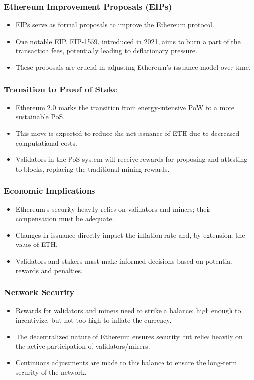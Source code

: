 \documentclass{beamer}
\begin{document}
\begin{frame}
\frametitle{Ethereum Improvement Proposals (EIPs)}
\begin{itemize}
    \item EIPs serve as formal proposals to improve the Ethereum protocol.
    \item One notable EIP, EIP-1559, introduced in 2021, aims to burn a part of the transaction fees, potentially leading to deflationary pressure.
    \item These proposals are crucial in adjusting Ethereum's issuance model over time.
\end{itemize}
\end{frame}


\begin{frame}
\frametitle{Transition to Proof of Stake}
\begin{itemize}
    \item Ethereum 2.0 marks the transition from energy-intensive PoW to a more sustainable PoS.
    \item This move is expected to reduce the net issuance of ETH due to decreased computational costs.
    \item Validators in the PoS system will receive rewards for proposing and attesting to blocks, replacing the traditional mining rewards.
\end{itemize}
\end{frame}


\begin{frame}
\frametitle{Economic Implications}
\begin{itemize}
    \item Ethereum's security heavily relies on validators and miners; their compensation must be adequate.
    \item Changes in issuance directly impact the inflation rate and, by extension, the value of ETH.
    \item Validators and stakers must make informed decisions based on potential rewards and penalties.
\end{itemize}
\end{frame}


\begin{frame}
\frametitle{Network Security}
\begin{itemize}
    \item Rewards for validators and miners need to strike a balance: high enough to incentivize, but not too high to inflate the currency.
    \item The decentralized nature of Ethereum ensures security but relies heavily on the active participation of validators/miners.
    \item Continuous adjustments are made to this balance to ensure the long-term security of the network.
\end{itemize}
\end{frame}
\end{document}
